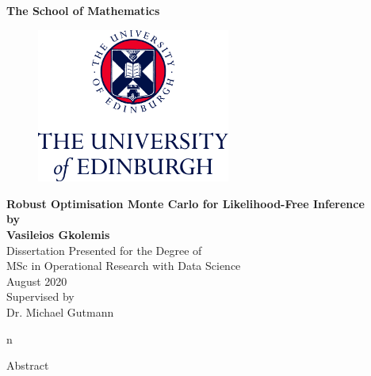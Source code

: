 \documentclass[11pt,twoside]{article}
\numberwithin{Theorem}{section}
\numberwithin{Definition}{section}
\numberwithin{Lemma}{section}
\numberwithin{Algorithm}{section}
\numberwithin{equation}{section}
\begin{document}
\pagestyle{empty}

\begin{titlepage}
\vspace*{.5em}
\center
\textbf{\large{The School of Mathematics}} \\
\vspace*{1em}
\begin{figure}[!h]
\centering
\includegraphics[width=180pt]{Thesis/images/CentredLogoCMYK.jpg}
\end{figure}
\vspace{2em}
\textbf{\Huge{Robust Optimisation Monte Carlo for Likelihood-Free Inference}}\\[2em]
\textbf{\LARGE{by}}\\
\vspace{2em}
\textbf{\LARGE{Vasileios Gkolemis}}\\
\vspace{6.5em}
\Large{Dissertation Presented for the Degree of\\
MSc in Operational Research with Data Science}\\
\vspace{6.5em}
\Large{August 2020}\\
\vspace{3em}
\Large{Supervised by\\Dr. Michael Gutmann}
\vfill
\end{titlepage}

\cleardoublepage
n
\begin{center}
\Large{Abstract}
\end{center}


\clearpage
\end{document}
